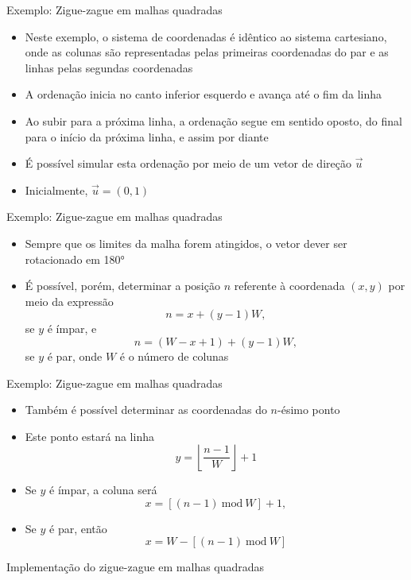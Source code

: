 \begin{frame}[fragile]{Exemplo: Zigue-zague em malhas quadradas}

    \begin{itemize}
        \item Neste exemplo, o sistema de coordenadas é idêntico ao sistema cartesiano, onde as colunas são representadas pelas primeiras coordenadas do par e as linhas pelas segundas coordenadas

        \item A ordenação inicia no canto inferior esquerdo e avança até o fim da linha

        \item Ao subir para a próxima linha, a ordenação segue em sentido oposto, do final para o início da próxima linha, e assim por diante

        \item É possível simular esta ordenação por meio de um vetor de direção $\vec{u}$

        \item Inicialmente, $\vec{u} = (0, 1)$
    \end{itemize}

\end{frame}

\begin{frame}[fragile]{Exemplo: Zigue-zague em malhas quadradas}

    \begin{itemize}
        \item Sempre que os limites da malha forem atingidos, o vetor dever ser rotacionado em 180° 

        \item É possível, porém, determinar a posição $n$ referente à coordenada $(x, y)$ por meio da expressão
$$
    n = x + (y - 1)W,
$$
se $y$ é ímpar, e
$$
    n = (W - x + 1) + (y - 1)W ,
$$
se $y$ é par, onde $W$ é o número de colunas

    \end{itemize}

\end{frame}

\begin{frame}[fragile]{Exemplo: Zigue-zague em malhas quadradas}

    \begin{itemize}
        \item Também é possível determinar as coordenadas do $n$-ésimo ponto

        \item Este ponto estará na linha
$$
    y = \left\lfloor \frac{n - 1}{W} \right\rfloor + 1
$$
        \item Se $y$ é ímpar, a coluna será
$$
    x = [(n - 1)\ \mathrm{mod}\ W] + 1,
$$

        \item Se $y$ é par, então
$$
    x = W - [(n - 1)\ \mathrm{mod}\ W]
$$
    \end{itemize}

\end{frame}

\begin{frame}[fragile]{Implementação do zigue-zague em malhas quadradas}
\end{frame}
